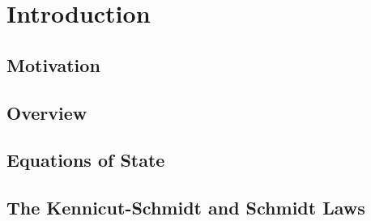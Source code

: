 \chapter{Introduction}

\section{Motivation}


\section{Overview}


\section{Equations of State}


\section{The Kennicut-Schmidt and Schmidt Laws}

